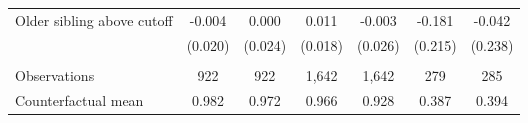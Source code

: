 {{\begin{tabular}{lcccccc}
Older sibling above cutoff&      -0.004   &       0.000   &       0.011   &      -0.003   &      -0.181   &      -0.042   \\
                    &     (0.020)   &     (0.024)   &     (0.018)   &     (0.026)   &     (0.215)   &     (0.238)   \\
                    &               &               &               &               &               &               \\
Observations        &         922   &         922   &       1,642   &       1,642   &         279   &         285   \\
Counterfactual mean &       0.982   &       0.972   &       0.966   &       0.928   &       0.387   &       0.394   \\
 

\bottomrule
\end{tabular}
}
}
